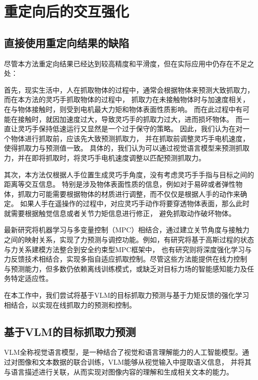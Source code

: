 \chapter{重定向后的交互强化}

\section{直接使用重定向结果的缺陷}
尽管本方法重定向结果已经达到较高精度和平滑度，但在实际应用中仍存在不足之处：

首先，现实生活中，人在抓取物体的过程中，通常会根据物体来预测大致抓取力，而在本方法的灵巧手抓取物体的过程中，
抓取力在未接触物体时与加速度相关，在与物体接触时，则受到电机最大力矩和物体表面性质影响。
而在此过程中有可能在接触时，就因加速度过大，导致灵巧手的抓取力过大，进而损坏物体。
而一直让灵巧手保持低速运行又显然是一个过于保守的策略。
因此，我们认为在对一个物体进行抓取前，应该先大致预测抓取力，
并在抓取前调整灵巧手电机速度，使得抓取力与预测值一致。
具体的，我们认为可以通过视觉语言模型来预测抓取力，并在即将抓取时，将灵巧手电机速度调整以匹配预测抓取力。

其次，本方法仅根据人手位置生成灵巧手角度，没有考虑灵巧手手指与目标之间的距离等交互信息。
特别是涉及物体表面性质的信息，例如对于易碎或者弹性物体，抓取力可能需要根据物体的材质进行调整，而不仅仅是根据人手的动作来确定。
如果人手在遥操作的过程中，对应灵巧手动作将要穿透物体表面，那么此时就需要根据触觉信息或者关节力矩信息进行修正，
避免抓取动作破坏物体。

最新研究将机器学习与多变量控制（MPC）相结合，通过建立关节角度与接触力之间的映射关系，实现了力预测与调控功能。例如，有研究将基于高斯过程的状态与力关系建模方法整合到安全约束型MPC框架中\cite{vulinImprovedLearningRobot2021}，
也有研究则将深度强化学习与力反馈技术相结合，实现多指自适应抓取控制\cite{huPhysicalInteractionReconstructing2022}。尽管这些方法能提供在线力控制
与预测能力，但多数仍依赖离线训练模式，或缺乏对目标力场的智能感知能力及任务特定适应性。

在本工作中，我们尝试将基于VLM的目标抓取力预测与基于力矩反馈的强化学习相结合，以实现在线抓取力的预测和控制。

\section{基于VLM的目标抓取力预测}
VLM全称视觉语言模型，是一种结合了视觉和语言理解能力的人工智能模型。通过对图像和文本数据的联合训练，VLM能够从视觉输入中提取语义信息，
并将其与语言描述进行关联，从而实现对图像内容的理解和生成相关文本的能力。

